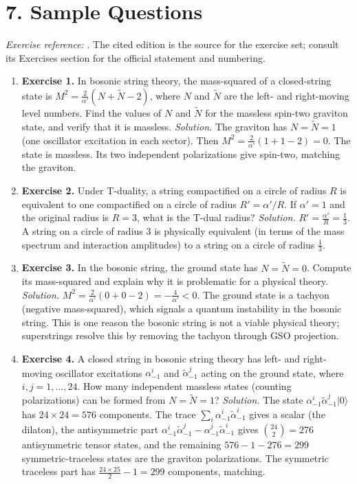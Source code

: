 \section*{7. Sample Questions}
\emph{Exercise reference:} \cite{string_ref1}. The cited edition is the source for the exercise set; consult its Exercises section for the official statement and numbering.
\begin{enumerate}[leftmargin=*,itemsep=0.9em]
\item \textbf{Exercise 1.} In bosonic string theory, the mass-squared of a closed-string state is $M^2 = \frac{2}{\alpha'}(N + \tilde{N} - 2)$, where $N$ and $\tilde{N}$ are the left- and right-moving level numbers. Find the values of $N$ and $\tilde{N}$ for the massless spin-two graviton state, and verify that it is massless. \emph{Solution.} The graviton has $N = \tilde{N} = 1$ (one oscillator excitation in each sector). Then $M^2 = \frac{2}{\alpha'}(1 + 1 - 2) = 0$. The state is massless. Its two independent polarizations give spin-two, matching the graviton.

\item \textbf{Exercise 2.} Under T-duality, a string compactified on a circle of radius $R$ is equivalent to one compactified on a circle of radius $R' = \alpha'/R$. If $\alpha' = 1$ and the original radius is $R = 3$, what is the T-dual radius? \emph{Solution.} $R' = \frac{\alpha'}{R} = \frac{1}{3}$. A string on a circle of radius $3$ is physically equivalent (in terms of the mass spectrum and interaction amplitudes) to a string on a circle of radius $\frac{1}{3}$.

\item \textbf{Exercise 3.} In the bosonic string, the ground state has $N = \tilde{N} = 0$. Compute its mass-squared and explain why it is problematic for a physical theory. \emph{Solution.} $M^2 = \frac{2}{\alpha'}(0 + 0 - 2) = -\frac{4}{\alpha'} < 0$. The ground state is a tachyon (negative mass-squared), which signals a quantum instability in the bosonic string. This is one reason the bosonic string is not a viable physical theory; superstrings resolve this by removing the tachyon through GSO projection.

\item \textbf{Exercise 4.} A closed string in bosonic string theory has left- and right-moving oscillator excitations $\alpha_{-1}^i$ and $\tilde{\alpha}_{-1}^j$ acting on the ground state, where $i, j = 1, \ldots, 24$. How many independent massless states (counting polarizations) can be formed from $N = \tilde{N} = 1$? \emph{Solution.} The state $\alpha_{-1}^i \tilde{\alpha}_{-1}^j |0\rangle$ has $24 \times 24 = 576$ components. The trace $\sum_i \alpha_{-1}^i \tilde{\alpha}_{-1}^i$ gives a scalar (the dilaton), the antisymmetric part $\alpha_{-1}^i \tilde{\alpha}_{-1}^j - \alpha_{-1}^j \tilde{\alpha}_{-1}^i$ gives $\binom{24}{2} = 276$ antisymmetric tensor states, and the remaining $576 - 1 - 276 = 299$ symmetric-traceless states are the graviton polarizations. The symmetric traceless part has $\frac{24 \times 25}{2} - 1 = 299$ components, matching.


\end{enumerate}
